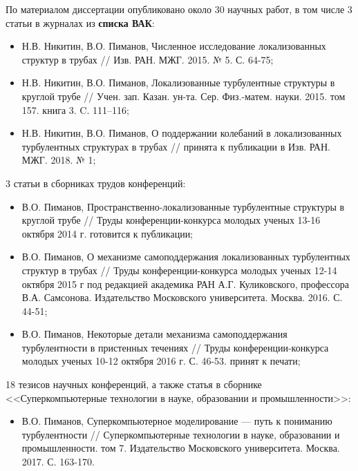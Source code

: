 По материалом диссертации опубликовано около 30 научных работ, в том числе 3 статьи в журналах из {\bf списка ВАК}:
\begin{itemize}
\item Н.В. Никитин, В.О. Пиманов, Численное исследование локализованных структур в трубах // Изв. РАН. МЖГ. 2015. № 5. С. 64-75;
\item Н.В. Никитин, В.О. Пиманов, Локализованные турбулентные структуры в круглой трубе // Учен.  зап.  Казан.  ун-та.  Сер.  Физ.-матем.  науки. 2015. том 157. книга 3. C. 111–116;
\item Н.В. Никитин, В.О. Пиманов, О поддержании колебаний в локализованных турбулентных структурах в трубах // принята к публикации в Изв. РАН. МЖГ. 2018. № 1;
\end{itemize}
3 статьи в сборниках трудов конференций:
\begin{itemize}
\item В.О. Пиманов, Пространственно-локализованные турбулентные структуры в круглой трубе // Труды конференции-конкурса молодых ученых 13-16 октября 2014 г. готовится к публикации;
\item В.О. Пиманов, О механизме самоподдержания локализованных турбулентных структур в трубах // Труды конференции-конкурса молодых ученых 12-14 октября 2015 г под редакцией академика РАН А.Г. Куликовского, профессора В.А. Самсонова. Издательство Московского университета. Москва. 2016. С. 44-51; 
\item В.О. Пиманов, Некоторые детали механизма самоподдержания турбулентности в пристенных течениях // Труды конференции-конкурса молодых ученых 10-12 октября 2016 г. С. 46-53. принят к печати;
\end{itemize}
18 тезисов научных конференций, а также статья в сборнике <<Суперкомпьютерные технологии в науке, образовании и промышленности>>:
\begin{itemize}
\item В.О. Пиманов, Суперкомпьютерное моделирование --- путь к пониманию турбулентности // Суперкомпьютерные технологии в науке, образовании и промышленности. том 7. Издательство Московского университета. Москва. 2017. С.  163-170. 
\end{itemize}


